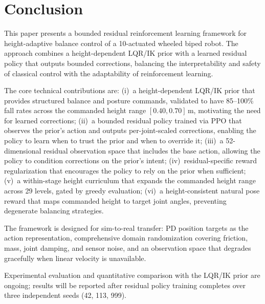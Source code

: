 \documentclass[conference]{IEEEtran}
\begin{document}
\section{Conclusion}
This paper presents a bounded residual reinforcement learning framework
for height-adaptive balance control of a 10-actuated wheeled biped robot.
The approach combines a height-dependent LQR/IK prior with a learned
residual policy that outputs bounded corrections, balancing the
interpretability and safety of classical control with the adaptability
of reinforcement learning.

The core technical contributions are:
(i)~a height-dependent LQR/IK prior that provides structured balance
and posture commands, validated to have 85--100\% fall rates across
the commanded height range $[0.40, 0.70]\,\mathrm{m}$, motivating the
need for learned corrections;
(ii)~a bounded residual policy trained via PPO that observes the
prior's action and outputs per-joint-scaled corrections, enabling
the policy to learn when to trust the prior and when to override it;
(iii)~a 52-dimensional residual observation space that includes the
base action, allowing the policy to condition corrections on the
prior's intent;
(iv)~residual-specific reward regularization that encourages the
policy to rely on the prior when sufficient;
(v)~a within-stage height curriculum that expands the commanded
height range across 29 levels, gated by greedy evaluation;
(vi)~a height-consistent natural pose reward that maps commanded
height to target joint angles, preventing degenerate balancing
strategies.

The framework is designed for sim-to-real transfer: PD position targets
as the action representation, comprehensive domain randomization covering
friction, mass, joint damping, and sensor noise, and an observation
space that degrades gracefully when linear velocity is unavailable.

Experimental evaluation and quantitative comparison with the LQR/IK prior
are ongoing; results will be reported after residual policy training
completes over three independent seeds (42, 113, 999).
\end{document}
